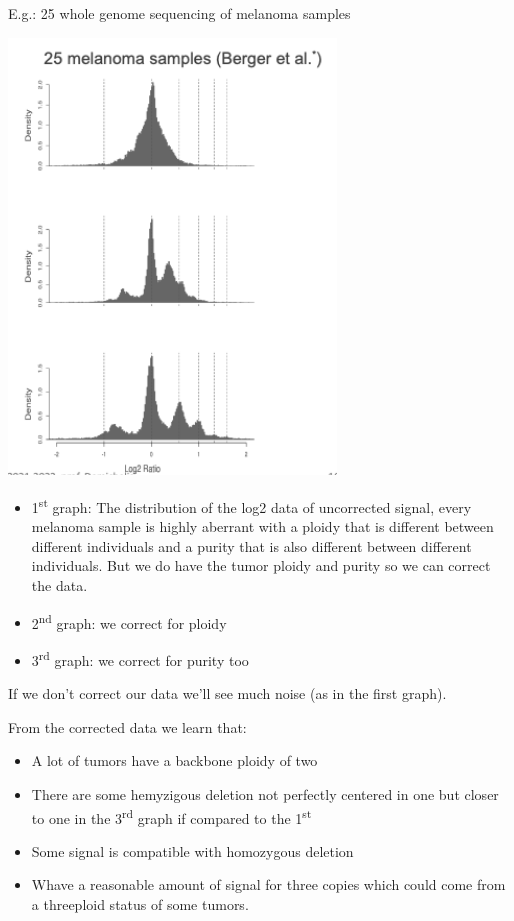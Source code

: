 E.g.: 25 whole genome sequencing of melanoma samples

\includegraphics[width=3.42917in,height=4.56111in]{image8.png}\\

\begin{itemize}
\item
  1\textsuperscript{st} graph: The distribution of the log2 data of uncorrected
  signal, every melanoma sample is highly aberrant with a ploidy that is
  different between different individuals and a purity that is also different
  between different individuals. But we do have the tumor ploidy and purity so
  we can correct the data.
\item
  2\textsuperscript{nd} graph: we correct for ploidy
\item
  3\textsuperscript{rd} graph: we correct for purity too
\end{itemize}

If we don't correct our data we'll see much noise (as in the first graph).

From the corrected data we learn that:

\begin{itemize}
\item
  A lot of tumors have a backbone ploidy of two
\item
  There are some hemyzigous deletion not perfectly centered in one but closer to
  one in the 3\textsuperscript{rd} graph if compared to the
  1\textsuperscript{st}
\item
  Some signal is compatible with homozygous deletion
\item
  Whave a reasonable amount of signal for three copies which could come from a
  threeploid status of some tumors.
\end{itemize}


